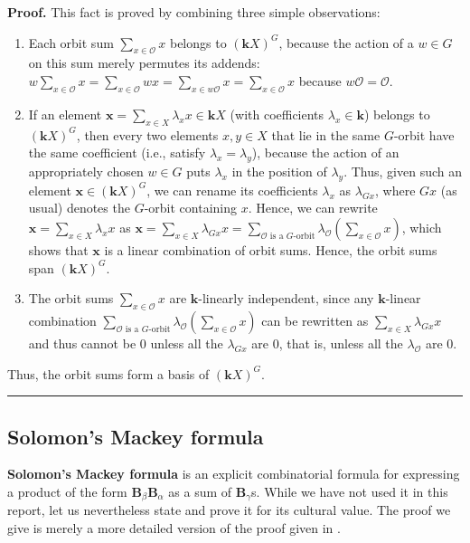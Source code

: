 \documentclass[12pt]{article}
\theoremstyle{definition}%
\theoremstyle{definition}%
\theoremstyle{remark}%
\newcommand{\tup}[1]{\left( #1 \right)}
\newcommand{\kk}{\mathbf{k}}
\newcommand{\BB}{\mathbf{B}}
\newcommand{\xx}{\mathbf{x}}
\newcommand{\defin}[1]{\textbf{#1}}
\newenvironment{proof}[1][Proof]{\noindent\textbf{#1.} }{\ \rule{0.5em}{0.5em}}
\begin{document}
\begin{proof}
This fact is proved by combining three simple observations:
	\begin{enumerate}
	\item Each orbit sum $\sum_{x \in \mathcal{O}} x$ belongs to $\tup{\kk X}^G$, because the action of a $w \in G$ on this sum merely permutes its addends: $w \sum_{x \in \mathcal{O}} x = \sum_{x \in \mathcal{O}} wx = \sum_{x \in w\mathcal{O}} x = \sum_{x \in \mathcal{O}} x$ because $w\mathcal{O} = \mathcal{O}$.
	\item If an element $\xx = \sum_{x \in X} \lambda_x x \in \kk X$ (with coefficients $\lambda_x \in \kk$) belongs to $\tup{\kk X}^G$, then every two elements $x,y \in X$ that lie in the same $G$-orbit have the same coefficient (i.e., satisfy $\lambda_x = \lambda_y$), because the action of an appropriately chosen $w \in G$ puts $\lambda_x$ in the position of $\lambda_y$.
	Thus, given such an element $\xx \in \tup{\kk X}^G$, we can rename its coefficients $\lambda_x$ as $\lambda_{Gx}$, where $Gx$ (as usual) denotes the $G$-orbit containing $x$.
	Hence, we can rewrite $\xx = \sum_{x \in X} \lambda_x x$ as $\xx = \sum_{x \in X} \lambda_{Gx} x = \sum_{\mathcal{O} \text{ is a $G$-orbit}} \lambda_{\mathcal{O}} \tup{\sum_{x \in \mathcal{O}} x}$, which shows that $\xx$ is a linear combination of orbit sums.
	Hence, the orbit sums span $\tup{\kk X}^G$.
	\item The orbit sums $\sum_{x \in \mathcal{O}} x$ are $\kk$-linearly independent, since any $\kk$-linear combination $\sum_{\mathcal{O} \text{ is a $G$-orbit}} \lambda_{\mathcal{O}} \tup{\sum_{x \in \mathcal{O}} x}$ can be rewritten as $\sum_{x \in X} \lambda_{Gx} x$ and thus cannot be $0$ unless all the $\lambda_{Gx}$ are $0$, that is, unless all the $\lambda_{\mathcal{O}}$ are $0$.
	\end{enumerate}
Thus, the orbit sums form a basis of $\tup{\kk X}^G$.
\end{proof}

\subsection{\label{subsec.omitted_proofs.smf}Solomon's Mackey formula}

\defin{Solomon's Mackey formula} is an explicit combinatorial formula for
expressing a product of the form $\BB_{\beta}\BB_{\alpha}$ as a
sum of $\BB_{\gamma}$s. While we have not used it in this report, let
us nevertheless state and prove it for its cultural value. The proof we give
is merely a more detailed version of the proof given in \cite[Corollary
2.4]{Saliola}.
\end{document}
